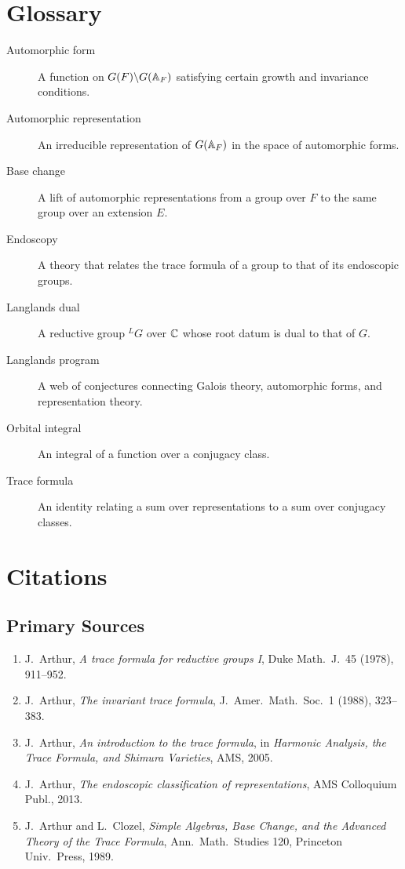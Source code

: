 \section*{Glossary}

\begin{description}
    \item[Automorphic form] A function on $G(F)\backslash G(\mathbb{A}_F)$ satisfying certain growth and invariance conditions.
    \item[Automorphic representation] An irreducible representation of $G(\mathbb{A}_F)$ in the space of automorphic forms.
    \item[Base change] A lift of automorphic representations from a group over $F$ to the same group over an extension $E$.
    \item[Endoscopy] A theory that relates the trace formula of a group to that of its endoscopic groups.
    \item[Langlands dual] A reductive group ${}^L G$ over $\mathbb{C}$ whose root datum is dual to that of $G$.
    \item[Langlands program] A web of conjectures connecting Galois theory, automorphic forms, and representation theory.
    \item[Orbital integral] An integral of a function over a conjugacy class.
    \item[Trace formula] An identity relating a sum over representations to a sum over conjugacy classes.
\end{description}

\section{Citations}\subsection*{Primary Sources}
\begin{enumerate}
    \item J.\ Arthur, \textit{A trace formula for reductive groups I}, Duke Math.\ J.\ 45 (1978), 911--952.
    \item J.\ Arthur, \textit{The invariant trace formula}, J.\ Amer.\ Math.\ Soc.\ 1 (1988), 323--383.
    \item J.\ Arthur, \textit{An introduction to the trace formula}, in \textit{Harmonic Analysis, the Trace Formula, and Shimura Varieties}, AMS, 2005.
    \item J.\ Arthur, \textit{The endoscopic classification of representations}, AMS Colloquium Publ., 2013.
    \item J.\ Arthur and L.\ Clozel, \textit{Simple Algebras, Base Change, and the Advanced Theory of the Trace Formula}, Ann.\ Math.\ Studies 120, Princeton Univ.\ Press, 1989.
\end{enumerate}

